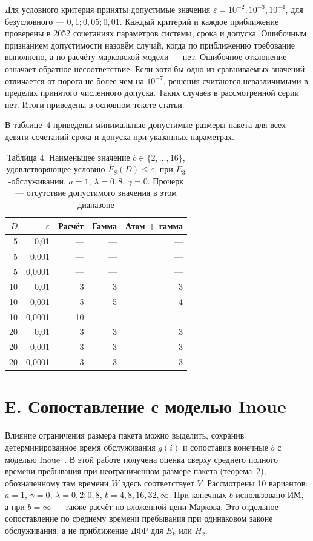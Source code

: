 Для условного критерия приняты допустимые значения $\varepsilon=10^{-2},10^{-3},10^{-4}$, для безусловного --- $0{,}1;0{,}05;0{,}01$. Каждый критерий и каждое приближение проверены в 2052 сочетаниях параметров системы, срока и допуска. Ошибочным признанием допустимости назовём случай, когда по приближению требование выполнено, а по расчёту марковской модели --- нет. Ошибочное отклонение означает обратное несоответствие. Если хотя бы одно из сравниваемых значений отличается от порога не более чем на $10^{-7}$, решения считаются неразличимыми в пределах принятого численного допуска. Таких случаев в рассмотренной серии нет. Итоги приведены в основном тексте статьи.

В таблице~4 приведены минимальные допустимые размеры пакета для всех девяти сочетаний срока и допуска при указанных параметрах.

\begin{table}[htbp]\centering\small
\caption{Таблица 4. Наименьшее значение $b\in\{2,\ldots,16\}$, удовлетворяющее условию $\overline F_S(D)\leq\varepsilon$, при $E_3$-обслуживании, $a=1$, $\lambda=0{,}8$, $\gamma=0$. Прочерк --- отсутствие допустимого значения в этом диапазоне}
\begin{tabular}{rrrrr}
\hline
$D$ & $\varepsilon$ & Расчёт & Гамма & Атом + гамма \\
\hline
5 & 0,01 & --- & --- & --- \\
5 & 0,001 & --- & --- & --- \\
5 & 0,0001 & --- & --- & --- \\
10 & 0,01 & 3 & 3 & 3 \\
10 & 0,001 & 5 & 5 & 4 \\
10 & 0,0001 & 10 & --- & --- \\
20 & 0,01 & 3 & 3 & 3 \\
20 & 0,001 & 3 & 3 & 3 \\
20 & 0,0001 & 3 & 3 & 3 \\
\hline
\end{tabular}

\end{table}

\section*{Е. Сопоставление с моделью Inoue}

Влияние ограничения размера пакета можно выделить, сохранив детерминированное время обслуживания $g(i)$ и сопоставив конечные $b$ с моделью Inoue~\cite{inoue2021}. В этой работе получена оценка сверху среднего полного времени пребывания при неограниченном размере пакета (теорема~2); обозначенному там времени $W$ здесь соответствует $V$. Рассмотрены 10 вариантов: $a=1$, $\gamma=0$, $\lambda=0{,}2;0{,}8$, $b=4,8,16,32,\infty$. При конечных $b$ использовано ИМ, а при $b=\infty$ --- также расчёт по вложенной цепи Маркова. Это отдельное сопоставление по среднему времени пребывания при одинаковом законе обслуживания, а не приближение ДФР для $E_k$ или $H_2$.

